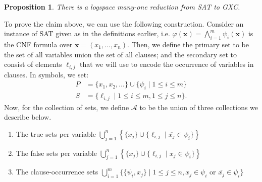 \documentclass[a4paper]{article}
\newtheorem{proposition}{Proposition}
\renewcommand{\vec}[1]{\boldsymbol{#1}}
\begin{document}
\begin{proposition}
  There is a logspace many-one reduction from \textsc{SAT} to \textsc{GXC}.
\end{proposition}
To prove the claim above, we can use the following
construction.
Consider an
instance of \textsc{SAT} given as in the definitions earlier, i.e.
$\varphi(\vec{x}) = \bigwedge_{i=1}^m \psi_i(\vec{x})$ is the CNF formula over
$\vec{x} = (x_1, \dots, x_n)$. Then, we define the primary set to be the set
of all variables union the set of all clauses; and the secondary set to
consist of elements $\ell_{i,j}$ that we will use to encode the occurrence of
variables in clauses. In symbols, we set:
\begin{align*}
  P & {} = \{x_1, x_2, \dots\} \cup \{\psi_i \mid 1 \leq i \leq m\}\\
  S & {} = \{\ell_{i,j} \mid 1 \leq i \leq m, 1 \leq j \leq n\}.
\end{align*}
Now, for the collection of sets, we define $\mathcal{A}$ to be the union of
three collections we describe below.
\begin{enumerate}
  \item The true sets per variable $\bigcup_{j=1}^{n} \left\{\{x_j\} \cup \{
    \ell_{i,j} \mid \overline{x_j} \in \psi_i\} \right\}$
  \item The false sets per variable $\bigcup_{j=1}^{n} \left\{\{x_j\} \cup \{
    \ell_{i,j} \mid x_j \in \psi_i\} \right\}$
  \item The clause-occurrence sets $\bigcup_{i=1}^{m} \{ \{ \psi_i, x_j \} \mid
    1 \leq j \leq n, x_j \in \psi_i \text{ or } \overline{x_j} \in \psi_i\}$
\end{enumerate}
\end{document}
